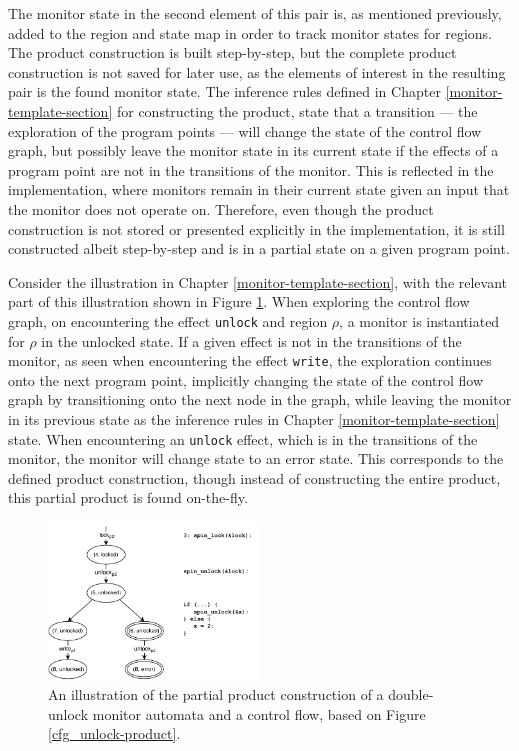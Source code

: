 \newpar The monitor state in the second element of this pair is, as mentioned previously, added to the region and state map in order to track monitor states for regions. The product construction is built step-by-step, but the complete product construction is not saved for later use, as the elements of interest in the resulting pair is the found monitor state. The inference rules defined in Chapter \ref{monitor-template-section} for constructing the product, state that a transition --- the exploration of the program points --- will change the state of the control flow graph, but possibly leave the monitor state in its current state if the effects of a program point are not in the transitions of the monitor. This is reflected in the implementation, where monitors remain in their current state given an input that the monitor does not operate on. Therefore, even though the product construction is not stored or presented explicitly in the implementation, it is still constructed albeit step-by-step and is in a partial state on a given program point.

\newpar Consider the illustration in Chapter \ref{monitor-template-section}, with the relevant part of this illustration shown in Figure \ref{cfg_unlock-product-partial}. When exploring the control flow graph, on encountering the effect \texttt{unlock} and region $\rho$, a monitor is instantiated for $\rho$ in the unlocked state. If a given effect is not in the transitions of the monitor, as seen when encountering the effect \texttt{write}, the exploration continues onto the next program point, implicitly changing the state of the control flow graph by transitioning onto the next node in the graph, while leaving the monitor in its previous state as the inference rules in Chapter \ref{monitor-template-section} state. When encountering an \texttt{unlock} effect, which is in the transitions of the monitor, the monitor will change state to an error state. This corresponds to the defined product construction, though instead of constructing the entire product, this partial product is found on-the-fly. 

\begin{figure}[H]
    \centering
    \includegraphics[width=0.5\textwidth]{implementation/figures/cfg_unlock-product-partial}
    \caption{An illustration of the partial product construction of a double-unlock monitor automata and a control flow, based on Figure \ref{cfg_unlock-product}.}
    \label{cfg_unlock-product-partial}
\end{figure}


